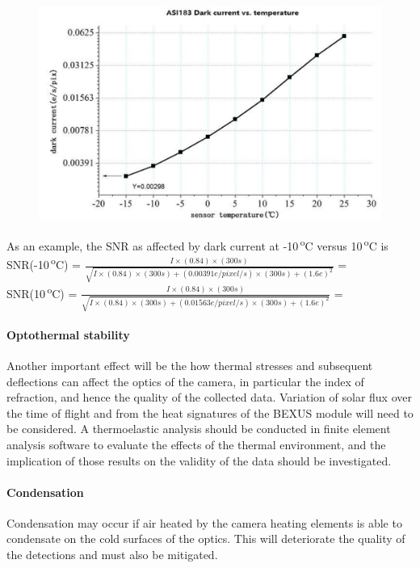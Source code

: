 	\begin{figure}[h!]
    \centering
    \includegraphics[scale=0.8]{4-experiment-design/img/mechanical/darkcurrent.png}
	\label{fig: darkcurrent}
	\end{figure}


As an example, the SNR as affected by dark current at -10\,\textsuperscript{o}C versus 10\,\textsuperscript{o}C is\\

 SNR(-10\,\textsuperscript{o}C) =  $\frac{I\times (0.84)\times (300s)}{\sqrt{I\times (0.84)\times (300s)+(0.00391e/pixel/s)\times (300s)+(1.6e)^2}}$ = \\
 
 SNR(10\,\textsuperscript{o}C) =  $\frac{I\times (0.84)\times (300s)}{\sqrt{I\times (0.84)\times (300s)+(0.01563e/pixel/s)\times (300s)+(1.6e)^2}}$ = \\


\paragraph{Optothermal stability}
Another important effect will be the how thermal stresses and subsequent deflections can affect the optics of the camera, in particular the index of refraction, and hence the quality of the collected data. Variation of solar flux over the time of flight and from the heat signatures of the BEXUS module will need to be considered. A thermoelastic analysis should be conducted in finite element analysis software to evaluate the effects of the thermal environment, and the implication of those results on the validity of the data should be investigated. \

\paragraph{Condensation}
Condensation may occur if air heated by the camera heating elements is able to condensate on the cold surfaces of the optics. This will deteriorate the quality of the detections and must also be mitigated.  \

